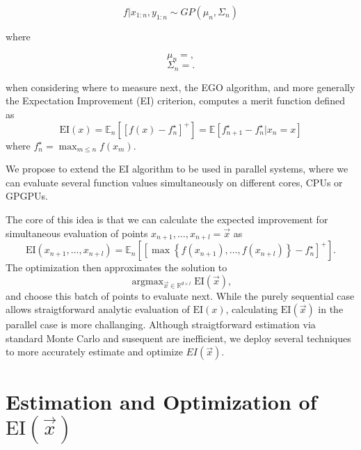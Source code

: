 \documentclass[phd,tocprelim]{cornell}
\DeclareMathOperator*{\argmax}{argmax}
\begin{document}
\begin{equation}
 f|x_{1:n}, y_{1:n} \sim GP(\mu_{n}, \Sigma_{n})
\end{equation}

where

\begin{equation}
 \mu_{n} = ,
\end{equation}
\begin{equation}
 \Sigma_{n} = .
\end{equation}

when considering where to measure next, the EGO algorithm, and more generally the Expectation Improvement (EI) criterion, computes a merit function defined as
\begin{equation}
 \mbox{EI}(x) = \mathbb{E}_{n} \left[\left[ f(x) - f_{n}^{\star} \right]^{+} \right] = \mathbb{E} \left[ f_{n+1}^{\star} - f_{n}^{\star} | x_{n} = x\right]
\end{equation}
where $f_{n}^{\star} = \max_{m \leq n} f(x_{m})$.

We propose to extend the EI algorithm to be used in parallel systems, where we can evaluate several function values simultaneously on different cores, CPUs or GPGPUs.

The core of this idea is that we can calculate the expected improvement for simultaneous evaluation of points $x_{n+1}, \ldots, x_{n+l} = \vec{x}$ as
\begin{equation}
 \mbox{EI}(x_{n+1}, \ldots, x_{n+l}) = \mathbb{E}_{n}\left[\left[\max\left\{f(x_{n+1}), \ldots, f(x_{n+l})\right\} - f_{n}^{\star}\right]^{+}\right].
\end{equation}
The optimization then approximates the solution to
\begin{equation}
 \argmax_{\vec{x} \in \mathbb{R}^{d \times l}} \mbox{EI}(\vec{x}),
\end{equation}
and choose this batch of points to evaluate next. While the purely sequential case allows straigtforward analytic evaluation of $\mbox{EI}(x)$, calculating $\mbox{EI}(\vec{x})$ in the parallel case is more challanging. Although straigtforward estimation via standard Monte Carlo and susequent are inefficient, we deploy several techniques to more accurately estimate and optimize $EI(\vec{x})$.

\section{Estimation and Optimization of $\mbox{EI}(\vec{x})$}
\end{document}
